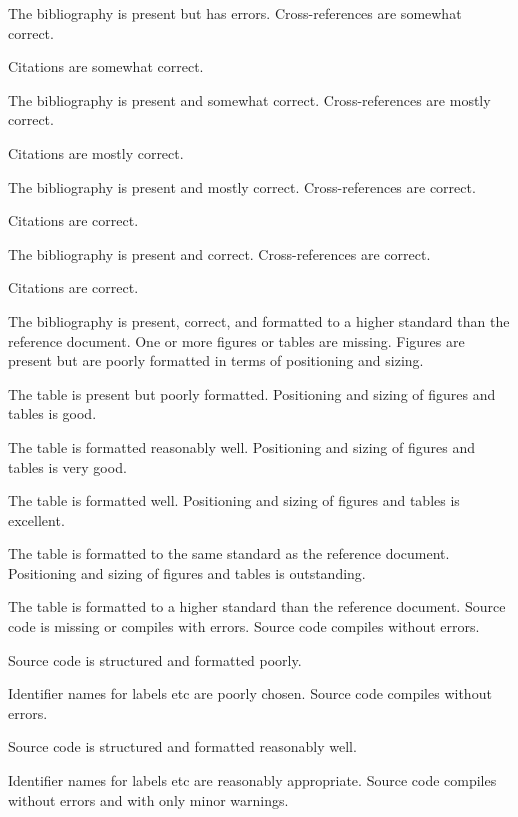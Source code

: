 \documentclass{../../../fal_assignment}
\begin{document}
\begin{markingrubric}
			\par The bibliography is present but has errors.
		\grade Cross-references are somewhat correct.
			\par Citations are somewhat correct.
			\par The bibliography is present and somewhat correct.
		\grade Cross-references are mostly correct.
			\par Citations are mostly correct.
			\par The bibliography is present and mostly correct.
		\grade Cross-references are correct.
			\par Citations are correct.
			\par The bibliography is present and correct.
		\grade Cross-references are correct.
			\par Citations are correct.
			\par The bibliography is present, correct, and formatted to a higher standard than the reference document.
		\grade\fail One or more figures or tables are missing.
		\grade Figures are present but are poorly formatted in terms of positioning and sizing.
			\par The table is present but poorly formatted.
		\grade Positioning and sizing of figures and tables is good.
			\par The table is formatted reasonably well.
		\grade Positioning and sizing of figures and tables is very good.
			\par The table is formatted well.
		\grade Positioning and sizing of figures and tables is excellent.
			\par The table is formatted to the same standard as the reference document.
		\grade Positioning and sizing of figures and tables is outstanding.
			\par The table is formatted to a higher standard than the reference document.
		\grade\fail Source code is missing or compiles with errors.
		\grade Source code compiles without errors.
			\par Source code is structured and formatted poorly.
			\par Identifier names for labels etc are poorly chosen.
		\grade Source code compiles without errors.
			\par Source code is structured and formatted reasonably well.
			\par Identifier names for labels etc are reasonably appropriate.
		\grade Source code compiles without errors and with only minor warnings.

\end{markingrubric}
\end{document}
